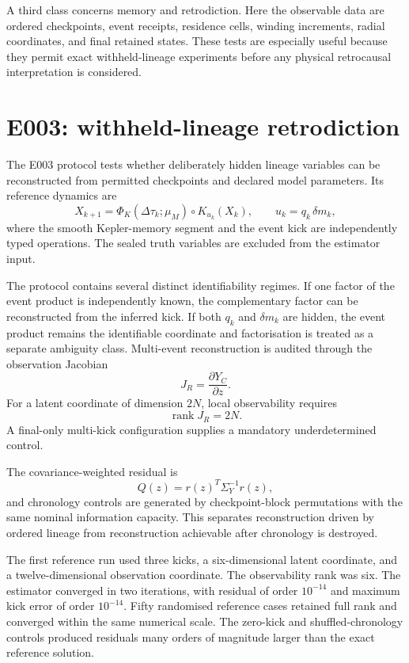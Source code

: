 \documentclass[11pt]{book}
\begin{document}
A third class concerns memory and retrodiction. Here the observable data are ordered checkpoints, event receipts, residence cells, winding increments, radial coordinates, and final retained states. These tests are especially useful because they permit exact withheld-lineage experiments before any physical retrocausal interpretation is considered.

\section{E003: withheld-lineage retrodiction}

The E003 protocol tests whether deliberately hidden lineage variables can be reconstructed from permitted checkpoints and declared model parameters. Its reference dynamics are
\[
X_{k+1}
=
\Phi_K(\Delta\tau_k;\mu_M)
\circ K_{u_k}(X_k),
\qquad
u_k=q_k\,\delta m_k,
\]
where the smooth Kepler-memory segment and the event kick are independently typed operations. The sealed truth variables are excluded from the estimator input.

The protocol contains several distinct identifiability regimes. If one factor of the event product is independently known, the complementary factor can be reconstructed from the inferred kick. If both \(q_k\) and \(\delta m_k\) are hidden, the event product remains the identifiable coordinate and factorisation is treated as a separate ambiguity class. Multi-event reconstruction is audited through the observation Jacobian
\[
J_R=\frac{\partial Y_C}{\partial z}.
\]
For a latent coordinate of dimension \(2N\), local observability requires
\[
\operatorname{rank}J_R=2N.
\]
A final-only multi-kick configuration supplies a mandatory underdetermined control.

The covariance-weighted residual is
\[
Q(z)=r(z)^T\Sigma_Y^{-1}r(z),
\]
and chronology controls are generated by checkpoint-block permutations with the same nominal information capacity. This separates reconstruction driven by ordered lineage from reconstruction achievable after chronology is destroyed.

The first reference run used three kicks, a six-dimensional latent coordinate, and a twelve-dimensional observation coordinate. The observability rank was six. The estimator converged in two iterations, with residual of order \(10^{-14}\) and maximum kick error of order \(10^{-14}\). Fifty randomised reference cases retained full rank and converged within the same numerical scale. The zero-kick and shuffled-chronology controls produced residuals many orders of magnitude larger than the exact reference solution.
\end{document}
